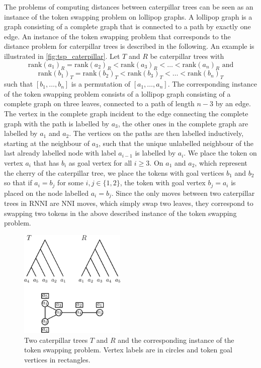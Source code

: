 \documentclass[11pt]{amsart}
\newcommand{\rnni}{\mathrm{RNNI}}
\newcommand{\rank}{\mathrm{rank}}
\newcommand{\nni}{\mathrm{NNI}}
\begin{document}
The problems of computing distances between caterpillar trees can be seen as an instance of the token swapping problem on lollipop graphs.
A lollipop graph is a graph consisting of a complete graph that is connected to a path by exactly one edge.
An instance of the token swapping problem that corresponds to the distance problem for caterpillar trees is described in the following.
An example is illustrated in \autoref{fig:tsp_caterpillar}.
Let $T$ and $R$ be caterpillar trees with
\[\rank(a_1)_R = \rank(a_2)_R < \rank(a_3)_R < \ldots < \rank(a_n)_R \text{ and}\]
\[\rank(b_1)_T = \rank(b_2)_T < \rank(b_3)_T < \ldots < \rank(b_n)_T\]
such that $[b_1, \ldots, b_n]$ is a permutation of $[a_1, \ldots, a_n]$.
The corresponding instance of the token swapping problem consists of a lollipop graph consisting of a complete graph on three leaves, connected to a path of length $n-3$ by an edge.
The vertex in the complete graph incident to the edge connecting the complete graph with the path is labelled by $a_3$, the other ones in the complete graph are labelled by $a_1$ and $a_2$.
The vertices on the paths are then labelled inductively, starting at the neighbour of $a_3$, such that the unique unlabelled neighbour of the last already labelled node with label $a_{i-1}$ is labelled by $a_i$.
We place the token on vertex $a_i$ that has $b_i$ as goal vertex for all $i \geq 3$.
On $a_1$ and $a_2$, which represent the cherry of the caterpillar tree, we place the tokens with goal vertices $b_1$ and $b_2$ so that if $a_i = b_j$ for some $i,j \in \{1,2\}$, the token with goal vertex $b_j=a_i$ is placed on the node labelled $a_i=b_j$.
Since the only moves between two caterpillar trees in $\rnni$ are $\nni$ moves, which simply swap two leaves, they correspond to swapping two tokens in the above described instance of the token swapping problem.
\begin{figure}[ht]
	\includegraphics[width=0.45\textwidth]{tsp_caterpillar.eps}
	\caption{Two caterpillar trees $T$ and $R$ and the corresponding instance of the token swapping problem.
	Vertex labels are in circles and token goal vertices in rectangles.}
	\label{fig:tsp_caterpillar}
\end{figure}
\end{document}
